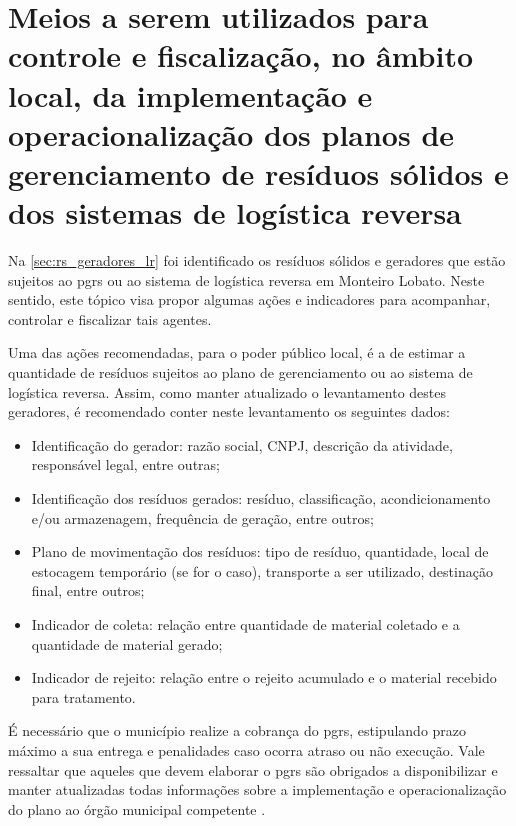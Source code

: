 \newpage
\section{Meios a serem utilizados para controle e fiscalização, no âmbito local, da implementação e operacionalização dos planos de gerenciamento de resíduos sólidos e dos sistemas de logística reversa}
\label{sec:meios_controle_fisc}

Na \autoref{sec:rs_geradores_lr} foi identificado os resíduos sólidos e geradores que estão sujeitos ao \gls{pgrs} ou ao sistema de logística reversa em Monteiro Lobato. Neste sentido, este tópico visa propor algumas ações e indicadores para acompanhar, controlar e fiscalizar tais agentes.

Uma das ações recomendadas, para o poder público local, é a de estimar a quantidade de resíduos sujeitos ao plano de gerenciamento ou ao sistema de logística reversa.  Assim, como manter atualizado o levantamento destes geradores, é recomendado conter neste levantamento os seguintes dados: \cite{agevap_manual_2019}

\begin{itemize}
	\item Identificação do gerador: razão social, CNPJ, descrição da atividade, responsável legal, entre outras;
	\item Identificação dos resíduos gerados: resíduo, classificação, acondicionamento e/ou armazenagem, frequência de geração, entre outros; 
	\item Plano de movimentação dos resíduos: tipo de resíduo, quantidade, local de estocagem temporário (se for o caso), transporte a ser utilizado, destinação final, entre outros;
	\item Indicador de coleta: relação entre quantidade de material coletado e a quantidade de material gerado;
	\item Indicador de rejeito: relação entre o rejeito acumulado e o material recebido para tratamento.
\end{itemize}

É necessário que o município realize a cobrança do \gls{pgrs}, estipulando prazo máximo a sua entrega e penalidades caso ocorra atraso ou não execução. Vale ressaltar que aqueles que devem elaborar o \gls{pgrs} são obrigados a disponibilizar e manter atualizadas todas informações sobre a implementação e operacionalização do plano ao órgão municipal competente \cite{brasil:12305}. 


